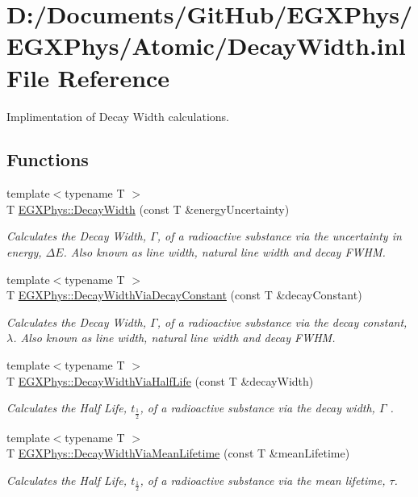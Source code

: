 \hypertarget{_decay_width_8inl}{}\section{D\+:/\+Documents/\+Git\+Hub/\+E\+G\+X\+Phys/\+E\+G\+X\+Phys/\+Atomic/\+Decay\+Width.inl File Reference}
\label{_decay_width_8inl}


Implimentation of Decay Width calculations.  


\subsection*{Functions}
\begin{DoxyCompactItemize}
\item 
{\footnotesize template$<$typename T $>$ }\\T \hyperlink{group___atomic_gae232ec8bb39710131be898c057a25620}{E\+G\+X\+Phys\+::\+Decay\+Width} (const T \&energy\+Uncertainty)
\begin{DoxyCompactList}\small\item\em Calculates the Decay Width, $\Gamma$, of a radioactive substance via the uncertainty in energy, $\Delta E$. Also known as line width, natural line width and decay F\+W\+HM. \end{DoxyCompactList}\item 
{\footnotesize template$<$typename T $>$ }\\T \hyperlink{group___atomic_ga143a666966efecc535a59bb4f36a79c6}{E\+G\+X\+Phys\+::\+Decay\+Width\+Via\+Decay\+Constant} (const T \&decay\+Constant)
\begin{DoxyCompactList}\small\item\em Calculates the Decay Width, $\Gamma$, of a radioactive substance via the decay constant, $\lambda$. Also known as line width, natural line width and decay F\+W\+HM. \end{DoxyCompactList}\item 
{\footnotesize template$<$typename T $>$ }\\T \hyperlink{group___atomic_gac83ded776bc027f9e92ccbd650926904}{E\+G\+X\+Phys\+::\+Decay\+Width\+Via\+Half\+Life} (const T \&decay\+Width)
\begin{DoxyCompactList}\small\item\em Calculates the Half Life, $t_{\frac{1}{2}}$, of a radioactive substance via the decay width, $\Gamma$ . \end{DoxyCompactList}\item 
{\footnotesize template$<$typename T $>$ }\\T \hyperlink{group___atomic_ga0b65d991f3f3d72cf09a4a7b343a01ca}{E\+G\+X\+Phys\+::\+Decay\+Width\+Via\+Mean\+Lifetime} (const T \&mean\+Lifetime)
\begin{DoxyCompactList}\small\item\em Calculates the Half Life, $t_{\frac{1}{2}}$, of a radioactive substance via the mean lifetime, $\tau$. \end{DoxyCompactList}\end{DoxyCompactItemize}


